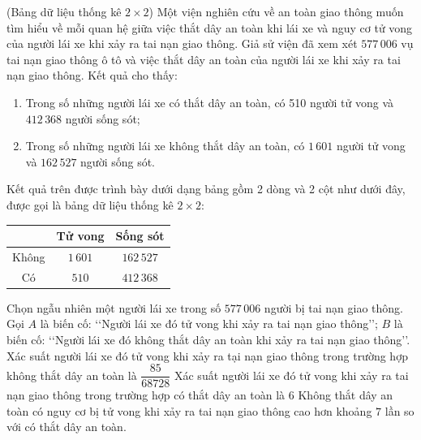 \begin{ex}%
	(Bảng dữ liệu thống kê $2\times 2$) Một viện nghiên cứu về an toàn giao thông muốn tìm hiểu về mỗi quan hệ giữa việc thắt dây an toàn khi lái xe và nguy cơ tử vong của người lái xe khi xảy ra tai nạn giao thông. Giả sử viện đã xem xét $577\,006$ vụ tai nạn giao thông ô tô và việc thắt dây an toàn của người lái xe khi xảy ra tai nạn giao thông. Kết quả cho thấy:
	\begin{enumerate}[$-$]
		\item Trong số những người lái xe có thắt dây an toàn, có 510 người tử vong và $412\,368$ người sống sót;
		\item Trong số những người lái xe không thắt dây an toàn, có $1\,601$ người tử vong và $162\,527$ người sống sót.
	\end{enumerate}
	Kết quả trên được trình bày dưới dạng bảng gồm 2 dòng và 2 cột như dưới đây, được gọi là bảng dữ liệu thống kê $2\times 2$:
	\begin{center}
		\begin{tabular}{|c|c|c|}
			\hline \backslashbox{Thắt dây an toàn}{Kết quả}&Tử vong&Sống sót\\
			\hline Không&$1\,601$&$162\,527$\\
			\hline Có&$510$&$412\,368$\\
			\hline 
		\end{tabular}
	\end{center}
	Chọn ngẫu nhiên một người lái xe trong số $577\,006$ người bị tai nạn giao thông.
	Gọi $A$ là biến cố: \lq\lq Người lái xe đó tử vong khi xảy ra tai nạn giao thông\rq\rq;
	$B$ là biến cố: \lq\lq Người lái xe đó không thắt dây an toàn khi xảy ra tai nạn giao thông\rq\rq.
	{Xác suất người lái xe đó tử vong khi xảy ra tại nạn giao thông trong trường hợp không thắt dây an toàn là $\dfrac{85}{68728}$}
	{\True Xác suất người lái xe đó tử vong khi xảy ra tai nạn giao thông trong trường hợp có thắt dây an toàn là $6$}
	{Không thắt dây an toàn có nguy cơ bị tử vong khi xảy ra tai nạn giao thông cao hơn khoảng $7$ lần so với có thắt dây an toàn.}
\end{ex}
